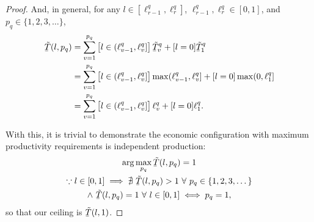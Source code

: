 \documentclass[hidelinks, nonatbib]{elsarticle}
\begin{document}
\begin{lemma}
\begin{proof}
        And, in general, for any $l \in [\ell_{r-1}^{q} ,\ell_{r}^{q}]$, $\ell_{r-1}^{q}, \ell_{r}^{q} \in [0,1]$, and $p_q \in \{1,2,3,\dots \}$,
        \begin{align}
            \underaccent{\bar}{\tilde{T}}(l, p_q)
            &=
            \sum_{v=1}^{p_q}\left[
                l \in (
                    \ell_{v-1}^{q}
                    ,\ell_{v}^{q}
                ]
            \right]
            \underaccent{\bar}{\tilde{T}}_{v}^{q}
            +
            [l = 0]
            \underaccent{\bar}{\tilde{T}}_{1}^{q}
            \\
            &=
            \sum_{v=1}^{p_q}\left[
                l \in (
                    \ell_{v-1}^{q}
                    ,\ell_{v}^{q}
                ]
            \right]
            \max(
                \ell_{v-1}^{q}
                ,\ell_{v}^{q}
            ]
            +
            [l = 0]
            \max(
                0
                ,\ell_{1}^{q}
            ]
            \\
            &=
            \sum_{v=1}^{p_q}\left[
                l \in (
                    \ell_{v-1}^{q}
                    ,\ell_{v}^{q}
                ]
            \right]
            \ell_{v}^{q}
            +
            [l = 0]
            \ell_{1}^{q}
            .
        \end{align}
        
        With this, it is trivial to demonstrate the economic configuration with maximum productivity requirements is independent production:
        \begin{gather}
            \arg\max_{p_q}{
                \underaccent{\bar}{\tilde{T}}(l, p_q)
            }
            =
            1
            \\
            \because
            l \in [0,1]
            \implies
            \nexists \
            \underaccent{\bar}{\tilde{T}}(l, p_q)
            >
            1
            \
            \forall
            \
            p_q \in \{1,2,3,\dots\}
            \\
            \land \
            \underaccent{\bar}{\tilde{T}}(l, p_q)
            =
            1
            \
            \forall
            \
            l \in [0,1]
            \iff
            p_q = 1
            ,
        \end{gather}
        so that our ceiling is $\underaccent{\bar}{\tilde{T}}(l, 1)$.


\end{proof}
\end{lemma}
\end{document}

